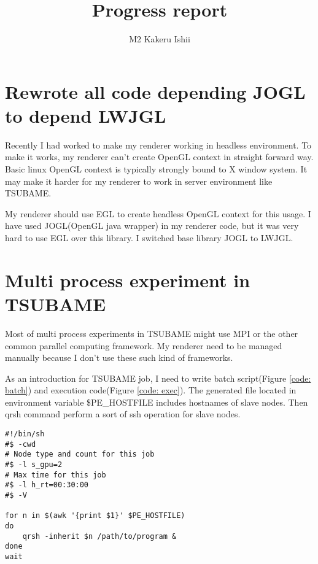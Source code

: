 \documentclass[a4]{article}
\title{Progress report}
\author{M2 Kakeru Ishii} %
\begin{document}
\twocolumn{
\maketitle
}

\section{Rewrote all code depending JOGL to depend LWJGL}

Recently I had worked to make my renderer working in headless environment.
To make it works, my renderer can't create OpenGL context in straight forward way.
Basic linux OpenGL context is typically strongly bound to X window system.
It may make it harder for my renderer to work in server environment like TSUBAME.

My renderer should use EGL to create headless OpenGL context for this usage.
I have used JOGL(OpenGL java wrapper) in my renderer code, but it was very hard to use EGL over this library.
I switched base library JOGL to LWJGL.

\section{Multi process experiment in TSUBAME}

Most of multi process experiments in TSUBAME might use MPI or the other common parallel computing framework.
My renderer need to be managed manually because I don't use these such kind of frameworks.


As an introduction for TSUBAME job, I need to write batch script(Figure \ref{code: batch}) and execution code(Figure \ref{code: exec}).
The generated file located in environment variable \$PE\_HOSTFILE includes hostnames of slave nodes.
Then qrsh command perform a sort of ssh operation for slave nodes.

\begin{figure*}
    \begin{verbatim}
#!/bin/sh
#$ -cwd
# Node type and count for this job
#$ -l s_gpu=2
# Max time for this job
#$ -l h_rt=00:30:00
#$ -V

for n in $(awk '{print $1}' $PE_HOSTFILE)
do
    qrsh -inherit $n /path/to/program &
done
wait    
    \end{verbatim}
    \caption{Batch job code for TSUBAME to invoke multi process program manually}
    \label{code: batch}
\end{figure*}
\end{document}
